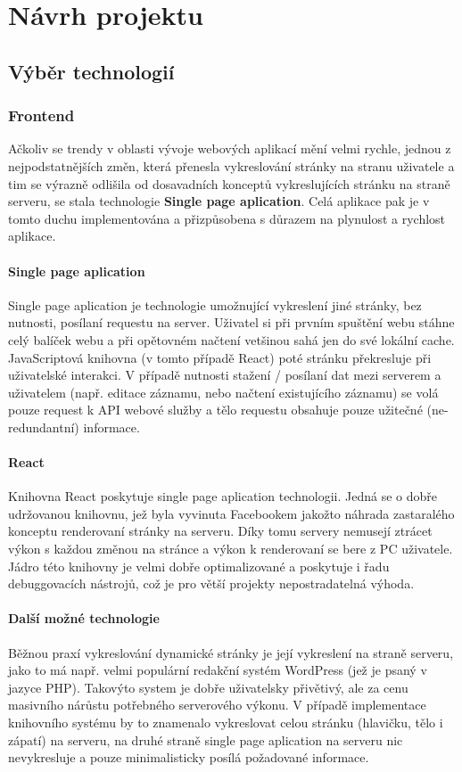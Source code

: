 \chapter{Návrh projektu}

\section{Výběr technologií}

\subsection{Frontend}
Ačkoliv se trendy v oblasti vývoje webových aplikací mění velmi rychle,
jednou z nejpodstatnějších změn, která přenesla vykreslování stránky
na stranu uživatele a tim se výrazně odlišila od dosavadních konceptů
vykreslujících stránku na straně serveru, se stala technologie
\textbf{Single page aplication}. Celá aplikace pak je v tomto duchu
implementována a přizpůsobena s důrazem na plynulost a rychlost aplikace.

\subsubsection{Single page aplication}
Single page aplication je technologie umožnující vykreslení jiné stránky,
bez nutnosti, posílaní requestu na server.
Uživatel si při prvním spuštění webu stáhne celý balíček webu a 
při opětovném načtení vetšinou sahá jen do své lokální cache.
JavaScriptová knihovna (v tomto případě React)
poté stránku překresluje při uživatelské interakci.
V případě nutnosti stažení / posílaní dat mezi serverem a uživatelem
(např. editace záznamu, nebo načtení existujícího záznamu)
se volá pouze request k API webové služby a tělo requestu obsahuje pouze
užitečné (ne-redundantní) informace. 


\subsubsection{React}
Knihovna React poskytuje single page aplication technologii.
Jedná se o dobře udržovanou knihovnu, jež byla vyvinuta Facebookem 
jakožto náhrada zastaralého konceptu renderovaní stránky na serveru.
Díky tomu servery nemusejí ztrácet výkon s každou změnou na stránce a
výkon k renderovaní se bere z PC uživatele.
Jádro této knihovny je velmi dobře optimalizované a poskytuje i řadu
debuggovacích nástrojů, což je pro větší projekty nepostradatelná výhoda.  


\subsubsection{Další možné technologie}
Běžnou praxí vykreslování dynamické stránky je její vykreslení na straně serveru,
jako to má např. velmi populární redakční systém WordPress (jež je psaný v jazyce PHP).
Takovýto system je dobře uživatelsky přivětivý, ale za cenu masivního nárůstu
potřebného serverového výkonu.
V případě implementace knihovního systému by to znamenalo vykreslovat
celou stránku (hlavičku, tělo i zápatí) na serveru,
na druhé straně single page aplication na serveru nic nevykresluje a
pouze minimalisticky posílá požadované informace.



